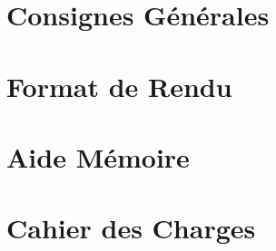 \documentclass[12pt,a4paper]{article}
\begin{document}
\maketitle





\newpage

\tableofcontents

\newpage

\section{Consignes Générales}

\bigskip



\newpage

\section{Format de Rendu}
\label{sec:FormatDeRendu}

\vspace*{1cm}



\newpage

\section{Aide Mémoire}
\label{sec:AideMemoire}

\vspace*{1cm}




\newpage


\section{Cahier des Charges}

\vspace*{0.7cm}






%
\end{document}
